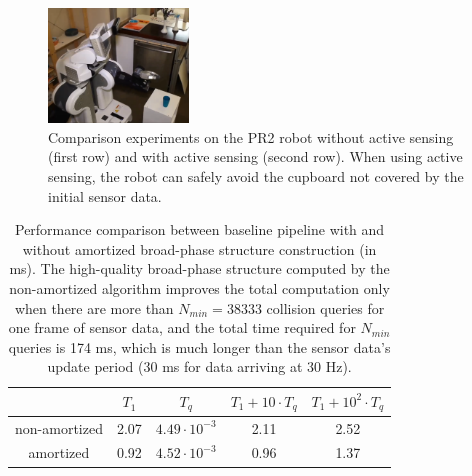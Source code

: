 \begin{figure}[!h]
  \includegraphics[height=1.2in]{figs/8/succ4.png}
  \caption[Comparison experiments on the PR2 robot without and with active sensing]{\label{fig:8:actualPR2} Comparison experiments on the PR2 robot without active sensing (first row) and with active sensing (second row). When using active sensing, the robot can safely avoid the cupboard not covered by the initial sensor data.}
\end{figure}


\begin{table}[!htbp]
\centering
\begin{tabular}{c|c c | c c}
 & $T_1$ & $T_q$ & $T_1 + 10 \cdot T_q$ & $T_1 + 10^2 \cdot T_q$ \\\hline
non-amortized & 2.07 & $4.49\cdot 10^{-3}$ & 2.11 & 2.52 \\
amortized & 0.92 & $4.52 \cdot 10^{-3}$ & 0.96 & 1.37 \\
\end{tabular}
\caption[Performance comparison between pipelines with and without amortized broad-phase structure construction]{Performance comparison between baseline pipeline with and without amortized broad-phase structure construction (in ms). The high-quality broad-phase structure computed by the non-amortized algorithm improves the total computation only when there are more than $N_{min} = 38333$ collision queries for one frame of sensor data, and the total time required for $N_{min}$ queries is 174 ms, which is much longer than the sensor data's update period ($30$ ms for data arriving at 30 Hz).
\label{table:8:amortized}
}
\end{table}

